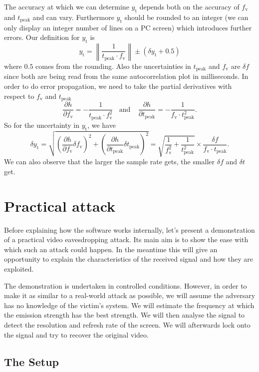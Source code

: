 \documentclass[a4paper,12pt,twoside,openright]{report}
\begin{document}
The accuracy at which we can determine $y_\text{t}$ depends both on the accuracy of $f_\text{v}$ and $t_\text{peak}$ and can vary. Furthermore $y_\text{t}$ should be rounded to an integer (we can only display an integer number of lines on a PC screen) which introduces further errors. Our definition for $y_\text{t}$ is
$$y_\text{t} = \left\| \frac{1}{t_\text{peak} \cdot f_\text{v}} \right\| \pm (\delta y_\text{t} + 0.5)$$
where $0.5$ comes from the rounding. Also the uncertainties in $t_\text{peak}$ and $f_\text{v}$ are $\delta f$ since both are being read from the same autocorrelation plot in milliseconds. In order to do error propagation, we need to take the partial derivatives with respect to $f_\text{v}$ and $t_\text{peak}$
$$\frac{\partial h}{\partial f_\text{v}} = - \frac{1}{t_\text{peak} \cdot f_\text{v}^2}
 \,\,\,\,\ \text{and} \,\,\,\,\ \
\frac{\partial h}{\partial t_\text{peak}} = - \frac{1}{f_\text{v} \cdot t_\text{peak}^2} .$$
So for the uncertainty in $y_\text{t}$, we have
$$\delta y_\text{t} =
\sqrt{\left( \frac{\partial h}{\partial f_\text{v}} \delta f_\text{v} \right)^2 + \left( \frac{\partial h}{\partial t_\text{peak}} \delta t_\text{peak} \right)^2} = 
\sqrt{\frac{1}{f_\text{v}^2} + \frac{1}{t_\text{peak}^2}} \times \frac{\delta f}{f_\text{v} \cdot t_\text{peak}} .$$
We can also observe that the larger the sample rate gets, the smaller $\delta f$ and $\delta t$ get.

\chapter{Practical attack} 

Before explaining how the software works internally, let's present a demonstration of a practical video eavesdropping attack. Its main aim is to show the ease with which such an attack could happen. In the meantime this will give an opportunity to explain the characteristics of the received signal and how they are exploited.

The demonstration is undertaken in controlled conditions. However, in order to make it as similar to a real-world attack as possible, we will assume the adversary has no knowledge of the victim's system. We will estimate the frequency at which the emission strength has the best strength. We will then analyse the signal to detect the resolution and refresh rate of the screen. We will afterwards lock onto the signal and try to recover the original video.

\section{The Setup}
\end{document}
